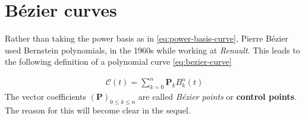 %
%
%
%
%
%
%
\section{B\'ezier curves}
Rather than taking the power basis as in \ref{eq:power-basis-curve}, Pierre B\'ezier used Bernstein polynomials, in the 1960s while working at \textit{Renault}. This leads to the following definition of a polynomial curve \ref{eq:bezier-curve}

\begin{align}
  \mathcal{C}(t) = \sum_{k=0}^n \mathbf{P}_k B_k^n(t) 
  \label{eq:bezier-curve}
\end{align}
\noindent
The vector coefficients $\left( \mathbf{P} \right)_{0 \le k \le n}$ are called \textit{B\'ezier points} or \textbf{control points}. The reason for this will become clear in the sequel.

